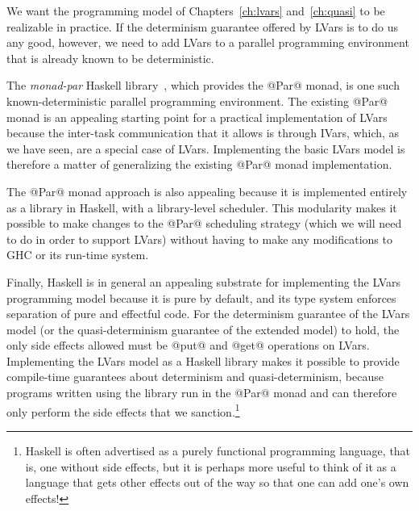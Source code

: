 We want the programming model of Chapters~\ref{ch:lvars}
and~\ref{ch:quasi} to be realizable in practice.  If the determinism
guarantee offered by LVars is to do us any good, however, we need to
add LVars to a parallel programming environment that is already known
to be deterministic.

The \emph{monad-par} Haskell library~\cite{monad-par}, which provides
the @Par@ monad, is one such known-deterministic parallel programming
environment.  The existing @Par@ monad is an appealing starting point
for a practical implementation of LVars because the inter-task
communication that it allows is through IVars, which, as we have seen,
are a special case of LVars.  Implementing the basic LVars model is
therefore a matter of generalizing the existing @Par@ monad
implementation.

The @Par@ monad approach is also appealing because it is implemented
entirely as a library in Haskell, with a library-level scheduler.
This modularity makes it possible to make changes to the @Par@
scheduling strategy (which we will need to do in order to support
LVars) without having to make any modifications to GHC or its run-time
system.

Finally, Haskell is in general an appealing substrate for implementing
the LVars programming model because it is pure by default, and its
type system enforces separation of pure and effectful code.  For the
determinism guarantee of the LVars model (or the quasi-determinism
guarantee of the extended model) to hold, the only side effects
allowed must be @put@ and @get@ operations on LVars.   Implementing the LVars model as a Haskell
library makes it possible to provide compile-time guarantees about
determinism and quasi-determinism, because programs written using the
library run in the @Par@ monad and can therefore only perform the side
effects that we sanction.\footnote{Haskell is often advertised as a
purely functional programming language, that is, one without side
effects, but it is perhaps more useful to think of it as a language
that gets other effects out of the way so that one can add one's own
effects!}

